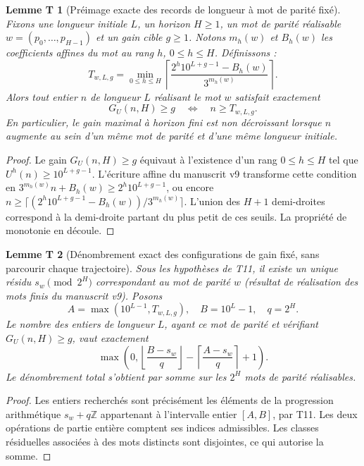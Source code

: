 \documentclass[11pt,a4paper]{article}
\newtheorem{lemmet}{Lemme T}
\newcommand{\UU}{U}
\begin{document}
\begin{lemmet}[Préimage exacte des records de longueur à mot de parité fixé]
Fixons une longueur initiale $L$, un horizon $H\ge1$, un mot de parité réalisable $w=(p_0,\ldots,p_{H-1})$ et un gain cible $g\ge1$. Notons $m_h(w)$ et $B_h(w)$ les coefficients affines du mot au rang $h$, $0\le h\le H$. Définissons :
\[
 \boxed{T_{w,L,g}=\min_{0\le h\le H}
 \left\lceil\frac{2^h10^{L+g-1}-B_h(w)}{3^{m_h(w)}}\right\rceil.}
\]
Alors tout entier $n$ de longueur $L$ réalisant le mot $w$ satisfait exactement
\[
 \boxed{G_U(n,H)\ge g\quad\Longleftrightarrow\quad n\ge T_{w,L,g}.}
\]
En particulier, le gain maximal à horizon fini est non décroissant lorsque $n$ augmente au sein d'un même mot de parité et d'une même longueur initiale.
\end{lemmet}
\begin{proof}
Le gain $G_U(n,H)\ge g$ équivaut à l'existence d'un rang $0\le h\le H$ tel que $\UU^h(n)\ge10^{L+g-1}$. L'écriture affine du manuscrit v9 transforme cette condition en
$3^{m_h(w)}n+B_h(w)\ge2^h10^{L+g-1}$, ou encore
$n\ge\lceil(2^h10^{L+g-1}-B_h(w))/3^{m_h(w)}\rceil$.
L'union des $H+1$ demi-droites correspond à la demi-droite partant du plus petit de ces seuils. La propriété de monotonie en découle.
\end{proof}

\begin{lemmet}[Dénombrement exact des configurations de gain fixé, sans parcourir chaque trajectoire]
Sous les hypothèses de T11, il existe un unique résidu $s_w\pmod{2^H}$ correspondant au mot de parité $w$ (résultat de réalisation des mots finis du manuscrit v9). Posons
\[
 A=\max(10^{L-1},T_{w,L,g}),\quad B=10^L-1,\quad q=2^H.
\]
Le nombre des entiers de longueur $L$, ayant ce mot de parité et vérifiant $G_U(n,H)\ge g$, vaut exactement
\[
 \boxed{\max\left(0,\left\lfloor\frac{B-s_w}{q}\right\rfloor-
 \left\lceil\frac{A-s_w}{q}\right\rceil+1\right).}
\]
Le dénombrement total s'obtient par somme sur les $2^H$ mots de parité réalisables.
\end{lemmet}
\begin{proof}
Les entiers recherchés sont précisément les éléments de la progression arithmétique $s_w+q\mathbb Z$ appartenant à l'intervalle entier $[A,B]$, par T11. Les deux opérations de partie entière comptent ses indices admissibles. Les classes résiduelles associées à des mots distincts sont disjointes, ce qui autorise la somme.
\end{proof}
\end{document}
